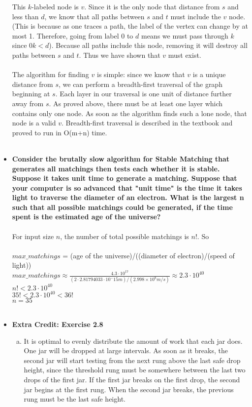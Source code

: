 \documentclass[a4paper]{article}
\begin{document}
\begin{itemize}
This $k$-labeled node is $v$. Since it is the only node that distance from $s$ and less than $d$, we know that all paths between $s$ and $t$ must include the $v$ node. (This is because as one traces a path, the label of the vertex can change by at most 1. Therefore, going from label $0$ to $d$ means we must pass through $k$ since $0  k < d$). Because all paths include this node, removing it will destroy all paths between $s$ and $t$. Thus we have shown that $v$ must exist. \\
\\
The algorithm for finding $v$ is simple: since we know that $v$ is a unique distance from $s$, we can perform a breadth-first traversal of the graph beginning at $s$. Each layer in our traversal is one unit of distance further away from $s$. As proved above, there must be at least one layer which contains only one node. As soon as the algorithm finds such a lone node, that node is a valid $v$. Breadth-first traversal is described in the textbook and proved to run in O(m+n) time.
\\
\\

\item{\textbf{Consider the brutally slow algorithm for Stable Matching that generates all matchings then tests each whether it is stable. 
Suppose it takes unit time to generate a matching. Suppose that your computer is so advanced that "unit time" is the time it takes light to traverse the diameter of an electron. What is the largest n such that all possible matchings could be generated, if the time spent is the estimated age of the universe?}} \\
\\
For input size $n$, the number of total possible matchings is $n!$. So \\ \\
$max\_matchings$ = (age of the universe)/((diameter of electron)/(speed of light)) \\
$max\_matchings \approx \frac{4.3 \cdot 10^{17}}{(2 \cdot 2.81794033 \cdot 10^-15 m) /(2.998×10^8 m/s)}\approx 2.3 \cdot 10^{40}$ \\
$n! < 2.3 \cdot 10^{40}$ \\
$35! < 2.3 \cdot 10^{40} < 36!$ \\
$n = 35$
\\
\\

\item{\textbf{Extra Credit: Exercise 2.8}} \\
\begin{enumerate}[a.]
\item It is optimal to evenly distribute the amount of work that each jar does. One jar will be dropped at large intervals. As soon as it breaks, the second jar will start testing from the next rung above the last safe drop height, since the threshold rung must be somewhere between the last two drops of the first jar. If the first jar breaks on the first drop, the second jar begins at the first rung. When the second jar breaks, the previous rung must be the last safe height.\\


\end{enumerate}
\end{itemize}
\end{document}
